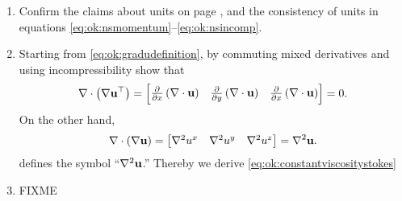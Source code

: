 \renewcommand{\labelenumi}{\arabic{chapter}.\arabic{enumi}\quad}
\begin{enumerate}
\item Confirm the claims about units on page \pageref{page:ok:units}, and the consistency of units in equations \eqref{eq:ok:nsmomentum}--\eqref{eq:ok:nsincomp}.

\item \label{exer:ok:constantviscositystokes}  Starting from \eqref{eq:ok:gradudefinition}, by commuting mixed derivatives and using incompressibility show that
\begin{equation*}
\nabla\cdot \left(\nabla \mathbf{u}^{\top}\right) = \begin{bmatrix}
    \frac{\partial}{\partial x}\left(\nabla\cdot \mathbf{u}\right) & \frac{\partial}{\partial y }\left(\nabla\cdot \mathbf{u}\right) & \frac{\partial}{\partial x} \left(\nabla\cdot \mathbf{u}\right)
    \end{bmatrix}
    = 0.
\end{equation*}
On the other hand,
\begin{equation*}
\nabla\cdot \left(\nabla \mathbf{u}\right) = \begin{bmatrix} \nabla^2 u^x & \nabla^2 u^y & \nabla^2 u^z \end{bmatrix} = \nabla^2 \mathbf{u}.
\end{equation*}
defines the symbol ``$\nabla^2 \mathbf{u}$.''  Thereby we derive \eqref{eq:ok:constantviscositystokes}

\item \label{exer:ok:smalldetails}  FIXME

\end{enumerate}
